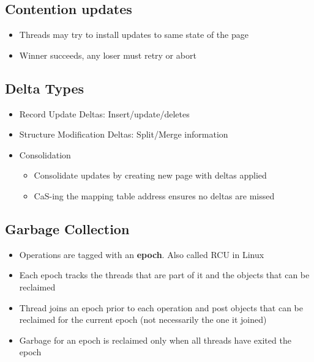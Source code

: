 \documentclass[11pt]{article}
\begin{document}
\subsection*{Contention updates}
    \begin{itemize}
        \item Threads may try to install updates to same state of the page
        \item Winner succeeds, any loser must retry or abort
    \end{itemize}
\subsection*{Delta Types}
    \begin{itemize}
        \item Record Update Deltas: Insert/update/deletes
        \item Structure Modification Deltas: Split/Merge information
        \item Consolidation
        \begin{itemize}
            \item Consolidate updates by creating new page with deltas applied
            \item CaS-ing the mapping table address ensures no deltas are missed
        \end{itemize}
    \end{itemize}
\subsection*{\textbf{Garbage Collection}}
    \begin{itemize}
        \item Operations are tagged with an \textbf{epoch}. Also called RCU in Linux
        \item Each epoch tracks the threads that are part of it and the objects that can be reclaimed
        \item Thread joins an epoch prior to each operation and post objects that can be reclaimed for the current epoch (not necessarily the one it joined)
        \item Garbage for an epoch is reclaimed only when all threads have exited the epoch
    \end{itemize}



\newpage


\end{document}
